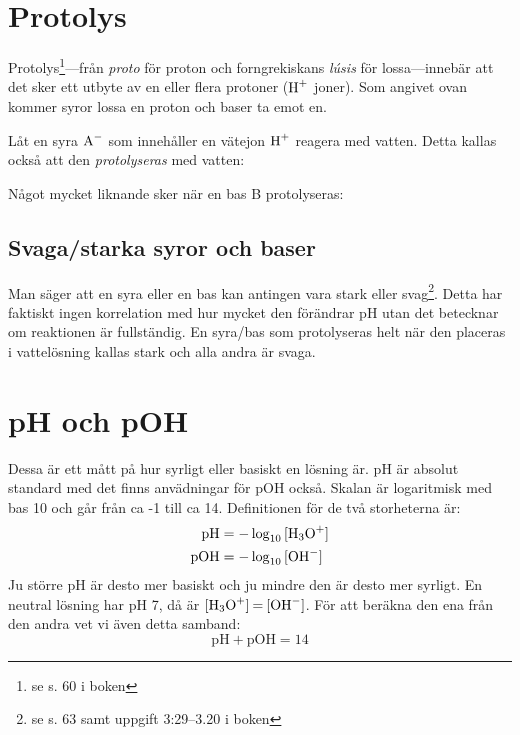 \section{Protolys}

Protolys\footnote{se s. 60 i boken}---från \emph{proto} för proton och forngrekiskans \emph{lúsis} för lossa---innebär att det sker ett utbyte av en eller flera protoner ($\ce{H+}$ joner). Som angivet ovan kommer syror lossa en proton och baser ta emot en.
\begin{exm}
    Låt en syra $\ce{A-}$ som innehåller en vätejon $\ce{H+}$ reagera med vatten. Detta kallas också att den \emph{protolyseras} med vatten:
    \begin{center}
    \end{center}
    Något mycket liknande sker när en bas B protolyseras:
    \begin{center}
    \end{center}
\end{exm}

\subsection{Svaga/starka syror och baser}
Man säger att en syra eller en bas kan antingen vara stark eller svag\footnote{se s. 63 samt uppgift 3:29--3.20 i boken}. Detta har faktiskt ingen korrelation med hur mycket den förändrar pH utan det betecknar om reaktionen är fullständig. En syra/bas som protolyseras helt när den placeras i vattelösning kallas stark och alla andra är svaga.

\section{pH och pOH}
Dessa är ett mått på hur syrligt eller basiskt en lösning är. pH är absolut standard med det finns anvädningar för pOH också. Skalan är logaritmisk med bas 10 och går från ca -1 till ca 14. Definitionen för de två storheterna är:
\begin{align*}
    \mathrm{pH} &= -\log_{10}{\ce{[H3O+]}} \\
    \mathrm{pOH} &= -\log_{10}{\ce{[OH^-]}}
\end{align*}
Ju större pH är desto mer basiskt och ju mindre den är desto mer syrligt. En neutral lösning har pH 7, då är $\ce{[H3O+] = [OH^-]}$. För att beräkna den ena från den andra vet vi även detta samband:
\[
    \mathrm{pH + pOH} = 14
\]

